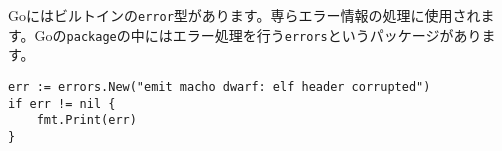 Goにはビルトインの\texttt{error}型があります。専らエラー情報の処理に使用されます。Goの\texttt{package}の中にはエラー処理を行う\texttt{errors}というパッケージがあります。


\begin{lstlisting}[numbers=none]
err := errors.New("emit macho dwarf: elf header corrupted")
if err != nil {
    fmt.Print(err)
}
\end{lstlisting}
